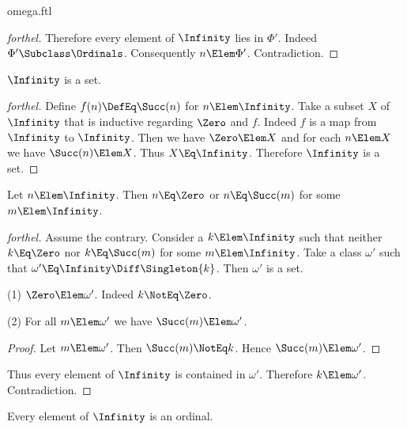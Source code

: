\documentclass{stex}
\begin{document}
\begin{smodule}{omega.ftl}
\begin{proof}[forthel]
  Therefore every element of $\Infinity$ lies in $\Phi'$.
  Indeed $\Phi' \Subclass \Ordinals$.
  Consequently $n \Elem \Phi'$.
  Contradiction.
\end{proof}

\begin{proposition*}[forthel]
  $\Infinity$ is a set.
\end{proposition*}
\begin{proof}[forthel]
  Define $f(n) \DefEq \Succ(n)$ for $n \Elem \Infinity$.
  Take a subset $X$ of $\Infinity$ that is inductive regarding $\Zero$ and $f$.
  Indeed $f$ is a map from $\Infinity$ to $\Infinity$.
  Then we have $\Zero \Elem X$ and for each $n \Elem X$ we have $\Succ(n) \Elem X$.
  Thus $X \Eq \Infinity$.
  Therefore $\Infinity$ is a set.
\end{proof}

\begin{proposition*}[forthel]
  Let $n \Elem \Infinity$.
  Then $n \Eq \Zero$ or $n \Eq \Succ(m)$ for some $m \Elem \Infinity$.
\end{proposition*}
\begin{proof}[forthel]
  Assume the contrary.
  Consider a $k \Elem \Infinity$ such that neither $k \Eq \Zero$ nor $k \Eq \Succ(m)$ for
  some $m \Elem \Infinity$.
  Take a class $\omega'$ such that $\omega' \Eq \Infinity \Diff \Singleton{k}$. %
  Then $\omega'$ is a set.

  (1) $\Zero \Elem \omega'$.
  Indeed $k \NotEq \Zero$.

  (2) For all $m \Elem \omega'$ we have $\Succ(m) \Elem \omega'$.
  \begin{proof}
    Let $m \Elem \omega'$.
    Then $\Succ(m) \NotEq k$.
    Hence $\Succ(m) \Elem \omega'$.
  \end{proof}

  Thus every element of $\Infinity$ is contained in $\omega'$.
  Therefore $k \Elem \omega'$.
  Contradiction.
\end{proof}

\begin{proposition*}[forthel]
  Every element of $\Infinity$ is an ordinal.
\end{proposition*}

\end{smodule}
\end{document}
